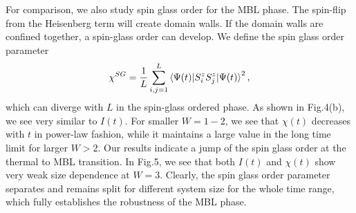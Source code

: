 \documentclass[prl,aps,epsf,showpacs,twocolumn,letterpaper]{revtex4}
\begin{document}
For comparison, we also study spin glass order for the MBL phase.  The spin-flip from the Heisenberg term will create domain walls.  If the domain walls are confined together, a spin-glass order can develop.  We define the spin glass order parameter 
\begin{equation}
\chi^{SG}=\frac 1 L \sum_{i,j=1}^L \braket{\Psi(t)|S_i^zS_j^z|\Psi(t)}^2 \text{,} \label{eq:sgo}
\end{equation}
which can diverge with $L$ in the spin-glass ordered phase.  As shown in Fig.4(b), we see very similar to $I(t)$.  For smaller $W=1-2$, we see that $\chi(t)$ decreases with $t$ in power-law fashion, while it maintains a large value in the long time limit for larger $W>2$.  Our results indicate a jump of the spin glass order at the thermal to MBL transition.  In Fig.5, we see that both $I(t)$ and $\chi(t)$ show very weak size dependence at $W=3$.  Clearly, the spin glass order parameter separates and remains split for different system size for the whole time range, which fully establishes the robustness of the MBL phase.  
\end{document}
